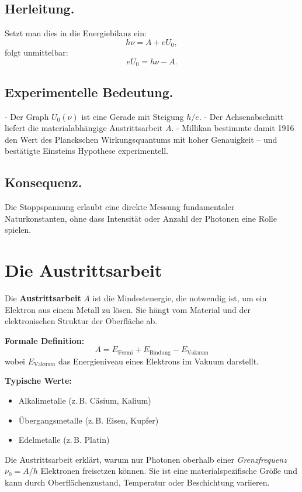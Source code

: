 \subsection*{Herleitung.}
Setzt man dies in die Energiebilanz ein:
\[
h\nu = A + eU_0,
\]
folgt unmittelbar:
\[
eU_0 = h\nu - A.
\]

\subsection*{Experimentelle Bedeutung.}
- Der Graph \(U_0(\nu)\) ist eine Gerade mit Steigung \(h/e\).  
- Der Achsenabschnitt liefert die materialabhängige Austrittsarbeit \(A\).  
- Millikan bestimmte damit 1916 den Wert des Planckschen Wirkungsquantums mit hoher Genauigkeit – und bestätigte Einsteins Hypothese experimentell.

\subsection*{Konsequenz.}
Die Stoppspannung erlaubt eine direkte Messung fundamentaler Naturkonstanten, ohne dass Intensität oder Anzahl der Photonen eine Rolle spielen.

\section{Die Austrittsarbeit}
\label{anhangA:austrittsarbeit}

Die \textbf{Austrittsarbeit} \( A \) ist die Mindestenergie, die notwendig ist, um ein Elektron aus einem Metall zu lösen. 
Sie hängt vom Material und der elektronischen Struktur der Oberfläche ab. 

\textbf{Formale Definition:}
\[
A = E_{\text{Fermi}} + E_{\text{Bindung}} - E_{\text{Vakuum}}
\]
wobei \( E_{\text{Vakuum}} \) das Energieniveau eines Elektrons im Vakuum darstellt.

\textbf{Typische Werte:}
\begin{itemize}
	\item Alkalimetalle (z.\,B. Cäsium, Kalium)
	\item Übergangsmetalle (z.\,B. Eisen, Kupfer)
	\item Edelmetalle (z.\,B. Platin)
\end{itemize}

Die Austrittsarbeit erklärt, warum nur Photonen oberhalb einer \emph{Grenzfrequenz} \( \nu_0 = A/h \) Elektronen freisetzen können. 
Sie ist eine materialspezifische Größe und kann durch Oberflächenzustand, Temperatur oder Beschichtung variieren.

